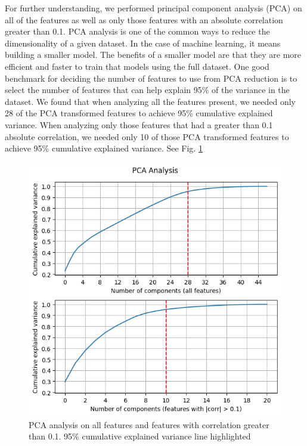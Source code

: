 For further understanding, we performed principal component analysis (PCA) on all of the features as well as only those features with an absolute correlation greater than 0.1. PCA analysis is one of the common ways to reduce the dimensionality of a given dataset. In the case of machine learning, it means building a smaller model. The benefits of a smaller model are that they are more efficient and faster to train that models using the full dataset. One good benchmark for deciding the number of features to use from PCA reduction is to select the number of features that can help explain 95\% of the variance in the dataset. We found that when analyzing all the features present, we needed only 28 of the PCA transformed features to achieve 95\% cumulative explained variance. When analyzing only those features that had a greater than 0.1 absolute correlation, we needed only 10 of those PCA transformed features to achieve 95\% cumulative explained variance. See Fig. \ref{fig:pca-all} 

\begin{figure}[!htb]
    \centering
    \includegraphics[width=1\linewidth]{figures//uploads/pca.png}
    \caption{PCA analysis on all features and features with correlation greater than 0.1. 95\% cumulative explained variance line highlighted}
    \label{fig:pca-all}
\end{figure}

